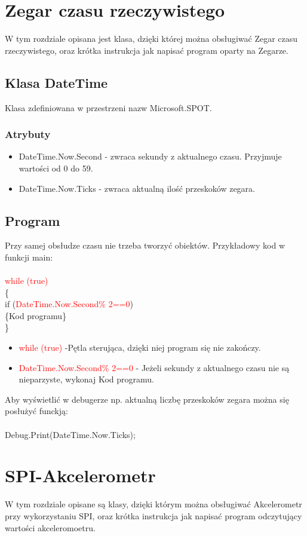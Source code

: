 \documentclass{article}
\begin{document}
\section{Zegar czasu rzeczywistego}
W tym rozdziale opisana jest klasa, dzięki której można obsługiwać Zegar czasu rzeczywistego, oraz krótka instrukcja jak napisać program oparty na Zegarze.
\subsection{Klasa DateTime} 
Klasa zdefiniowana w przestrzeni nazw Microsoft.SPOT.
\subsubsection{Atrybuty}
\begin{itemize}
\item DateTime.Now.Second - zwraca sekundy z aktualnego czasu. Przyjmuje wartości od 0 do 59.
\item DateTime.Now.Ticks - zwraca aktualną ilość przeskoków zegara. 
\end{itemize}
\subsection{Program}
Przy samej obsłudze czasu nie trzeba tworzyć obiektów. Przykładowy kod w funkcji main:\\\\
 \textcolor{red}{while (true)}\\
            \{\\
                if (\textcolor{red}{DateTime.Now.Second\% 2==0})\\
				\{Kod programu\}\\
	\}
\begin{itemize}
\item \textcolor{red}{while (true)} -Pętla sterująca, dzięki niej program się nie zakończy.
\item \textcolor{red}{DateTime.Now.Second\% 2==0} - Jeżeli sekundy z aktualnego czasu nie są nieparzyste, wykonaj Kod programu.
\end{itemize}
Aby wyświetlić w debugerze np. aktualną liczbę przeskoków zegara można się posłużyć funckją:\\\\
Debug.Print(DateTime.Now.Ticks);

\section{SPI-Akcelerometr}
W tym rozdziale opisane są klasy, dzięki którym można obsługiwać Akcelerometr przy wykorzystaniu SPI, oraz krótka instrukcja jak napisać program odczytujący wartości akceleromoetru.
\end{document}
